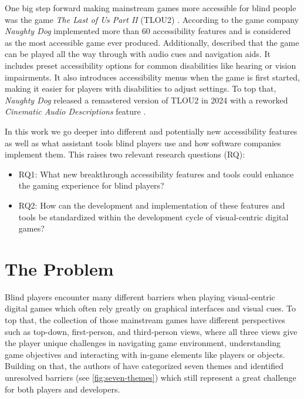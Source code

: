 \documentclass[sigconf,natbib=false,10pt]{acmart}
\begin{document}
	One big step forward making mainstream games more accessible for blind people was the game \emph{The Last of Us Part II} (TLOU2) \cite{playstation_last_2020, playstation_last_2020-1}. 
	According to \textcite{leite_extended_2021} the game company \emph{Naughty Dog} implemented more than 60 accessibility features and is considered as the most accessible game ever produced.
	Additionally, \textcite{dale_last_2024} described that the game can be played all the way through with audio cues and navigation aids.
	It includes preset accessibility options for common disabilities like hearing or vision impairments. 
	It also introduces accessibility menus when the game is first started, making it easier for players with disabilities to adjust settings.
	To top that, \emph{Naughty Dog} released a remastered version of TLOU2 in 2024 with a reworked \emph{Cinematic Audio Descriptions} feature \cite{playstation_last_2024}.
	
	In this work we go deeper into different and potentially new accessibility features as well as what assistant tools blind players use and how software companies implement them.
	This raises two relevant research questions (RQ):
	
	\begin{itemize}
		\item RQ1: What new breakthrough accessibility features and tools could enhance the gaming experience for blind players?
		\item RQ2: How can the development and implementation of these features and tools be standardized within the development cycle of visual-centric digital games?
	\end{itemize}
	
	\section{The Problem}
	Blind players encounter many different barriers when playing visual-centric digital games which often rely greatly on graphical interfaces and visual cues. 
	To top that, the collection of those mainstream games have different perspectives such as top-down, first-person, and third-person views, where all three views give the player unique challenges in navigating game environment, understanding game objectives and interacting with in-game elements like players or objects.
	Building on that, the authors of \textcite{goncalves_my_2023} have categorized seven themes and identified unresolved barriers (see \autoref{fig:seven-themes}) which still represent a great challenge for both players and developers.
	
\end{document}
